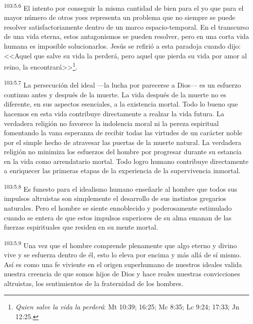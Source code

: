 \par
\textsuperscript{103:5.6} El intento por conseguir la misma cantidad de bien para el yo que para el mayor número de otros yoes representa un problema que no siempre se puede resolver satisfactoriamente dentro de un marco espacio-temporal. En el transcurso de una vida eterna, estos antagonismos se pueden resolver, pero en una corta vida humana es imposible solucionarlos. Jesús se refirió a esta paradoja cuando dijo: <<Aquel que salve su vida la perderá, pero aquel que pierda su vida por amor al reino, la encontrará>>\footnote{\textit{Quien salve la vida la perderá}: Mt 10:39; 16:25; Mc 8:35; Lc 9:24; 17:33; Jn 12:25.}.

\par
\textsuperscript{103:5.7} La persecución del ideal ---la lucha por parecerse a Dios--- es un esfuerzo continuo antes y después de la muerte. La vida después de la muerte no es diferente, en sus aspectos esenciales, a la existencia mortal. Todo lo bueno que hacemos en esta vida contribuye directamente a realzar la vida futura. La verdadera religión no favorece la indolencia moral ni la pereza espiritual fomentando la vana esperanza de recibir todas las virtudes de un carácter noble por el simple hecho de atravesar las puertas de la muerte natural. La verdadera religión no minimiza los esfuerzos del hombre por progresar durante su estancia en la vida como arrendatario mortal. Todo logro humano contribuye directamente a enriquecer las primeras etapas de la experiencia de la supervivencia inmortal.

\par
\textsuperscript{103:5.8} Es funesto para el idealismo humano enseñarle al hombre que todos sus impulsos altruistas son simplemente el desarrollo de sus instintos gregarios naturales. Pero el hombre se siente ennoblecido y poderosamente estimulado cuando se entera de que estos impulsos superiores de su alma emanan de las fuerzas espirituales que residen en su mente mortal.

\par
\textsuperscript{103:5.9} Una vez que el hombre comprende plenamente que algo eterno y divino vive y se esfuerza dentro de él, esto lo eleva por encima y más allá de sí mismo. Así es como una fe viviente en el origen superhumano de nuestros ideales valida nuestra creencia de que somos hijos de Dios y hace reales nuestras convicciones altruistas, los sentimientos de la fraternidad de los hombres.

